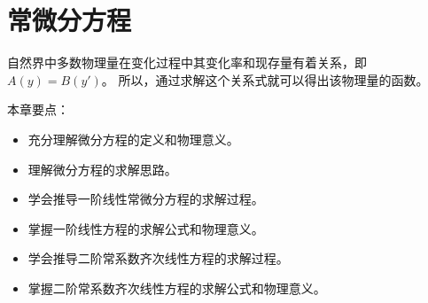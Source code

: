\chapter{常微分方程}

自然界中多数物理量在变化过程中其变化率和现存量有着关系，即$A\left( y \right) =B\left( y' \right) $。
所以，通过求解这个关系式就可以得出该物理量的函数。

本章要点：
\begin{itemize}
    \item 充分理解微分方程的定义和物理意义。
    \item 理解微分方程的求解思路。
    \item 学会推导一阶线性常微分方程的求解过程。
    \item 掌握一阶线性方程的求解公式和物理意义。
    \item 学会推导二阶常系数齐次线性方程的求解过程。
    \item 掌握二阶常系数齐次线性方程的求解公式和物理意义。
\end{itemize}

~

\newpage


\newpage


\newpage


\newpage


\newpage





